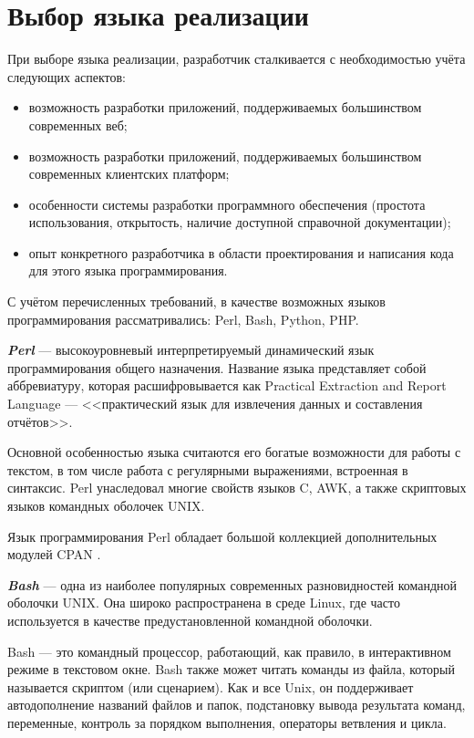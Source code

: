 \section{Выбор языка реализации} \label{technologic_langiage}


При выборе языка реализации, разработчик сталкивается с необходимостью учёта следующих аспектов:
\begin{itemize}
	\item возможность разработки приложений, поддерживаемых большинством современных веб;
	\item возможность разработки приложений, поддерживаемых большинством современных клиентских платформ;
	\item особенности системы разработки программного обеспечения (простота использования, открытость, наличие доступной справочной документации);
	\item опыт конкретного разработчика в области проектирования и написания кода для этого языка программирования.
\end{itemize}

С учётом перечисленных требований, в качестве возможных языков программирования рассматривались: Perl, Bash, Python, PHP.

\vspace{\baselineskip}
\textbf{\textit{Perl}} ---  высокоуровневый интерпретируемый динамический язык программирования общего назначения. Название языка представляет собой аббревиатуру, которая расшифровывается как Practical Extraction and Report Language — <<практический язык для извлечения данных и составления отчётов>>.

Основной особенностью языка считаются его богатые возможности для работы с текстом, в том числе работа с регулярными выражениями, встроенная в синтаксис. Perl унаследовал многие свойств языков C, AWK, а также скриптовых языков командных оболочек UNIX.

Язык программирования Perl обладает большой коллекцией дополнительных модулей CPAN \cite{cpan}.

\vspace{\baselineskip}
\textbf{\textit{Bash}} --- одна из наиболее популярных современных разновидностей командной оболочки UNIX. Она широко распространена в среде Linux, где часто используется в качестве предустановленной командной оболочки.

Bash --- это командный процессор, работающий, как правило, в интерактивном режиме в текстовом окне. Bash также может читать команды из файла, который называется скриптом (или сценарием). Как и все Unix, он поддерживает автодополнение названий файлов и папок, подстановку вывода результата команд, переменные, контроль за порядком выполнения, операторы ветвления и цикла.

